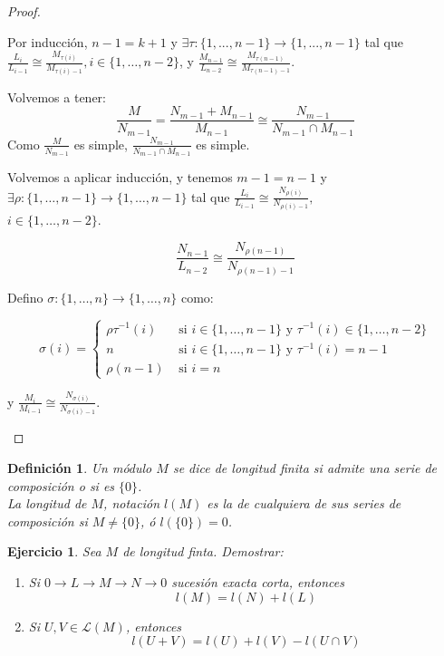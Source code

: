 \documentclass[11pt,a4paper]{article}
\theoremstyle{break}
\newtheorem{definition}[theorem]{Definición}
\newtheorem{task}[theorem]{Ejercicio}
\begin{document}
\begin{proof}
\begin{itemize}
\begin{enumerate}[label=\underline{Caso \alph*}:]
Por inducción, $n-1 = k+1$ y $\exists \tau: \{1, ..., n-1\} \to \{1, ..., n-1\}$ tal que $\frac{L_{i}}{L_{i-1}} \cong \frac{M_{\tau(i)}}{M_{\tau(i)-1}}, i \in \{1, \dots, n-2\}$, y $\frac{M_{n-1}}{L_{n-2}} \cong \frac{M_{\tau(n-1)}}{M_{\tau(n-1)-1}}$.

Volvemos a tener:
$$\frac{M}{N_{m-1}} = \frac{N_{m-1} + M_{n-1}}{M_{n-1}} \cong \frac{N_{m-1}}{N_{m-1} \cap M_{n-1}}$$
Como $\frac{M}{N_{m-1}}$ es simple, $\frac{N_{m-1}}{N_{m-1} \cap M_{n-1}}$ es simple.

Volvemos a aplicar inducción, y tenemos $m-1 = n-1$ y $\exists \rho: \{1, \dots, n-1\} \to \{1, \dots, n-1\}$ tal que $\frac{L_{i}}{L_{i-1}} \cong \frac{N_{\rho(i)}}{N_{\rho(i)-1}},$ \\ $i \in \{1, \dots, n-2\}$.

$$\frac{N_{n-1}}{L_{n-2}} \cong \frac{N_{\rho(n-1)}}{N_{\rho(n-1)-1}}$$

Defino $\sigma: \{1, \dots, n\} \to \{1, \dots, n\}$ como:
\begin{small}
\begin{equation*}
\sigma(i) =
\begin{cases}
\rho \tau^{-1} (i) & \text{ si } i \in \{1, \dots, n-1\} \text{ y } \tau^{-1}(i) \in \{1, \dots, n-2\} \\
n & \text{ si } i \in \{1, \dots, n-1\} \text{ y } \tau^{-1}(i) = n-1 \\
\rho(n-1) & \text{ si } i = n
\end{cases}
\end{equation*}
\end{small}
y $\frac{M_{i}}{M_{i-1}} \cong \frac{N_{\sigma(i)}}{N_{\sigma(i)-1}}$.
\end{enumerate}
\end{itemize}
\end{proof}

\begin{definition}
Un módulo $M$ se dice de longitud finita si admite una serie de composición o si es $\{0\}$. \\
La longitud de $M$, notación $l(M)$ es la de cualquiera de sus series de composición si $M \neq \{0\}$, ó $l(\{0\}) = 0$.
\end{definition}

\begin{task}
Sea $M$ de longitud finta. Demostrar:
\begin{enumerate}
\item Si $0 \to L \to M \to N \to 0$ sucesión exacta corta, entonces
$$l(M) = l(N) + l(L)$$
\item Si $U, V \in \mathcal{L}(M)$, entonces 
$$l(U + V) = l(U) + l(V) - l(U \cap V)$$
\end{enumerate}
\end{task}
\end{document}
